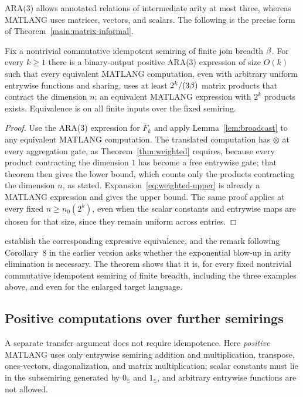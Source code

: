 ARA(3) allows annotated relations of intermediate arity at most three,
whereas MATLANG uses matrices, vectors, and scalars. The following is the
precise form of Theorem~\ref{main:matrix-informal}.
\begin{theorem}\label{main:matrix}
Fix a nontrivial commutative idempotent semiring of finite join breadth
$\beta$. For every $k\ge1$ there is a binary-output positive ARA(3)
expression of size $O(k)$ such that every equivalent MATLANG computation,
even with arbitrary uniform entrywise functions and sharing, uses at least
$2^k/(3\beta)$ matrix products that contract the dimension $n$; an
equivalent MATLANG expression with $2^k$ products exists. Equivalence is on
all finite inputs over the fixed semiring.
\end{theorem}
\begin{proof}
Use the ARA(3) expression for $F_k$ and apply Lemma~\ref{lem:broadcast} to
any equivalent MATLANG computation. The translated computation has $\otimes$
at every aggregation gate, as Theorem~\ref{thm:weighted} requires, because
every product contracting the dimension $1$ has become a free entrywise
gate; that theorem then gives the lower bound, which counts only the
products contracting the dimension $n$, as stated.
Expansion~\eqref{eq:weighted-upper} is already a MATLANG expression and
gives the upper bound. The same proof applies at every fixed
$n\ge n_0(2^k)$, even when the scalar constants and entrywise maps are
chosen for that size, since they remain uniform across entries.
\end{proof}
\citet{brijder2022} establish the corresponding expressive equivalence, and
the remark following Corollary~8 in the earlier version
\citep[p.~9]{brijder2019} asks whether the exponential blow-up in arity
elimination is necessary. The theorem shows that it is, for every fixed
nontrivial commutative idempotent semiring of finite breadth, including the
three examples above, and even for the enlarged target language.

\subsection{Positive computations over further semirings}\label{semi:positive-section}
A separate transfer argument does not require idempotence. Here
\emph{positive} MATLANG uses only entrywise semiring addition and
multiplication, transpose, ones-vectors, diagonalization, and matrix
multiplication; scalar constants must lie in the subsemiring generated by
$0_{\mathbb S}$ and $1_{\mathbb S}$, and arbitrary entrywise functions are
not allowed.


